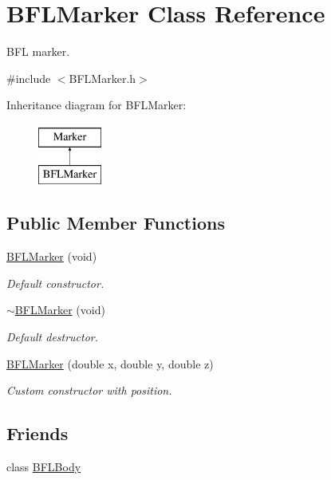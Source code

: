 \hypertarget{class_b_f_l_marker}{}\section{B\+F\+L\+Marker Class Reference}
\label{class_b_f_l_marker}


B\+FL marker.  




{\ttfamily \#include $<$B\+F\+L\+Marker.\+h$>$}

Inheritance diagram for B\+F\+L\+Marker\+:\begin{figure}[H]
\begin{center}
\leavevmode
\includegraphics[height=2.000000cm]{class_b_f_l_marker}
\end{center}
\end{figure}
\subsection*{Public Member Functions}
\begin{DoxyCompactItemize}
\item 
\hyperlink{class_b_f_l_marker_a5d6b8e4b1cfac580b86aa0f3b2f22c24}{B\+F\+L\+Marker} (void)
\begin{DoxyCompactList}\small\item\em Default constructor. \end{DoxyCompactList}\item 
\hyperlink{class_b_f_l_marker_a10ac169924a35ee14599992290540447}{$\sim$\+B\+F\+L\+Marker} (void)
\begin{DoxyCompactList}\small\item\em Default destructor. \end{DoxyCompactList}\item 
\hyperlink{class_b_f_l_marker_a2ec501d3d93f2dbde8e56e6155ef3c09}{B\+F\+L\+Marker} (double x, double y, double z)
\begin{DoxyCompactList}\small\item\em Custom constructor with position. \end{DoxyCompactList}\end{DoxyCompactItemize}
\subsection*{Friends}
\begin{DoxyCompactItemize}
\item 
class \hyperlink{class_b_f_l_marker_a253e046b9808d9a35fda96a16d22edb3}{B\+F\+L\+Body}
\end{DoxyCompactItemize}

